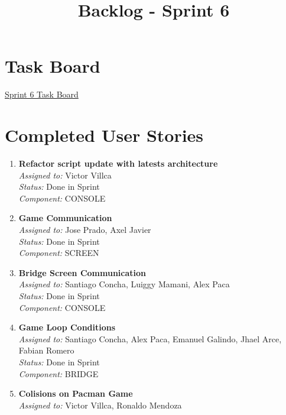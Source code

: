 \documentclass{article}
\begin{document}
    \title{Backlog - Sprint 6}
    \author{}
    \date{}
    \maketitle

    \section*{Task Board}
    \href{https://tree.taiga.io/project/joseluis-teran-coffeetime/taskboard/sprint-6-3003}{Sprint 6 Task Board}

    \section*{Completed User Stories}

    \begin{enumerate}
        \item \textbf{Refactor script update with latests architecture} \\
        \textit{Assigned to:} Victor Villca \\
        \textit{Status:} Done in Sprint \\
        \textit{Component:} CONSOLE
        \item \textbf{Game Communication} \\
        \textit{Assigned to:} Jose Prado, Axel Javier \\
        \textit{Status:} Done in Sprint \\
        \textit{Component:} SCREEN
        \item \textbf{Bridge Screen Communication} \\
        \textit{Assigned to:} Santiago Concha, Luiggy Mamani, Alex Paca \\
        \textit{Status:} Done in Sprint \\
        \textit{Component:} CONSOLE
        \item \textbf{Game Loop Conditions} \\
        \textit{Assigned to:} Santiago Concha, Alex Paca, Emanuel Galindo, Jhael Arce, Fabian Romero \\
        \textit{Status:} Done in Sprint \\
        \textit{Component:} BRIDGE
        \item \textbf{Colisions on Pacman Game} \\
        \textit{Assigned to:} Victor Villca, Ronaldo Mendoza  \\

\end{enumerate}
\end{document}

